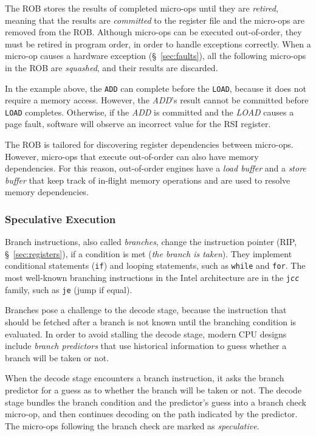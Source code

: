 The ROB stores the results of completed micro-ops until they are
\textit{retired}, meaning that the results are \textit{committed} to the
register file and the micro-ops are removed from the ROB. Although micro-ops
can be executed out-of-order, they must be retired in program order, in order
to handle exceptions correctly. When a micro-op causes a hardware exception
(\S~\ref{sec:faults}), all the following micro-ops in the ROB are
\textit{squashed}, and their results are discarded.

In the example above, the \texttt{ADD} can complete before the \texttt{LOAD},
because it does not require a memory access. However, the \textit{ADD}'s result
cannot be committed before \texttt{LOAD} completes. Otherwise, if the
\textit{ADD} is committed and the \textit{LOAD} causes a page fault, software
will observe an incorrect value for the  RSI register.


The ROB is tailored for discovering register dependencies between micro-ops.
However, micro-ops that execute out-of-order can also have memory dependencies.
For this reason, out-of-order engines have a \textit{load buffer} and a
\textit{store buffer} that keep track of in-flight memory operations and are
used to resolve memory dependencies.


\subsubsection{Speculative Execution}


Branch instructions, also called \textit{branches}, change the instruction
pointer (RIP, \S~\ref{sec:registers}), if a condition is met (\textit{the
branch is taken}). They implement conditional statements (\texttt{if}) and
looping statements, such as \texttt{while} and \texttt{for}. The most
well-known branching instructions in the Intel architecture are in the
\texttt{j\textit{cc}} family, such as \texttt{je} (jump if equal).

Branches pose a challenge to the decode stage, because the instruction that
should be fetched after a branch is not known until the branching condition is
evaluated. In order to avoid stalling the decode stage, modern CPU designs
include \textit{branch predictors} that use historical information to guess
whether a branch will be taken or not.

When the decode stage encounters a branch instruction, it asks the branch
predictor for a guess as to whether the branch will be taken or not. The
decode stage bundles the branch condition and the predictor's guess into a
branch check micro-op, and then continues decoding on the path indicated by the
predictor. The micro-ops following the branch check are marked as
\textit{speculative}.

